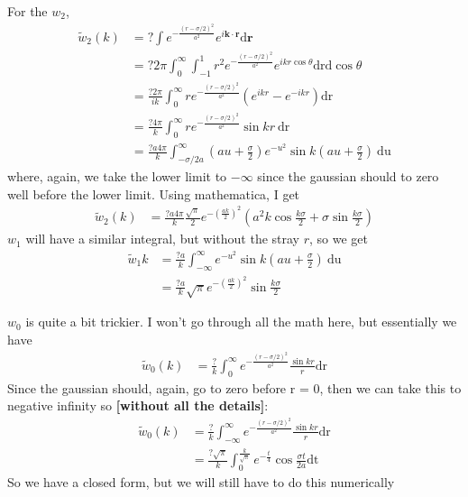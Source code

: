 \documentclass[letterpaper,twocolumn,amsmath,amssymb,prb]{revtex4-1}
\newcommand{\red}[1]{{\bf \color{red} #1}}
\newcommand{\rr}{\textbf{r}}
\newcommand{\fixme}[1]{\red{[#1]}}
\begin{document}
For the $w_2$,
\begin{align}
  \tilde{w}_2(k) &= ?\int e^{-\frac{(r-\sigma/2)^2}{a^2}} e^{i \mathbf{k} \cdot
    \rr} \textrm{d} \rr \\
  &= ? 2\pi \int_0^\infty \int_{-1}^1 r^2 e^{-\frac{(r-\sigma/2)^2}{a^2}}
  e^{ikr\cos{\theta}} \textrm{drd}\cos{\theta} \\
  &= \frac{?2\pi}{ik} \int_0^\infty r e^{-\frac{(r-\sigma/2)^2}{a^2}}
  \left(e^{ikr} - e^{-ikr}\right) \textrm{dr} \\
  &= \frac{?4\pi}{k} \int_0^\infty r e^{-\frac{(r-\sigma/2)^2}{a^2}}
  \sin{kr} ~\textrm{dr} \\
  &= \frac{?a4\pi}{k} \int_{-\sigma/2a}^\infty \left(au +
  \frac{\sigma}{2}\right) e^{-u^2} \sin{k\left(au +
  \frac{\sigma}{2}\right)} ~\textrm{du}
\end{align}
where, again, we take the lower limit to $-\infty$ since the gaussian
should to zero well before the lower limit. Using mathematica, I get
\begin{align}
  \tilde{w}_2(k) &=\frac{?a4\pi}{k}\frac{\sqrt{\pi}}{2}
  e^{-\left(\frac{ak}{2} \right)^2} \left(a^2 k
  \cos{\frac{k\sigma}{2}} +\sigma \sin{\frac{k\sigma}{2}} \right)
\end{align}
$w_1$ will have a similar integral, but without the stray $r$, so we
get
\begin{align}
  \tilde{w}_1{k}&= \frac{?a}{k} \int_{-\infty}^\infty e^{-u^2} \sin{k\left(au +
  \frac{\sigma}{2}\right)} ~\textrm{du} \\
  &= \frac{?a}{k}\sqrt{\pi}e^{-\left(\frac{ak}{2} \right)^2} \sin{\frac{k\sigma}{2}}
\end{align}

$w_0$ is quite a bit trickier.  I won't go through all the math here,
but essentially we have
\begin{align}
  \tilde{w}_0(k) &= \frac{?}{k}\int_0^\infty
  e^{-\frac{(r-\sigma/2)^2}{a^2}} \frac{\sin{kr}}{r}\textrm{dr}
\end{align}
Since the gaussian should, again, go to zero before r = 0, then we can
take this to negative infinity so \fixme{without all the details}:
\begin{align}
  \tilde{w}_0(k) &= \frac{?}{k}\int_{-\infty}^\infty
  e^{-\frac{(r-\sigma/2)^2}{a^2}} \frac{\sin{kr}}{r}\textrm{dr} \\
  &= \frac{?\sqrt{\pi}}{k}\int_0^{\frac{k}{\sqrt{\pi}}}
  e^{-\frac{t}{4}} \cos{\frac{\sigma t}{2a}}\textrm{dt}
\end{align}
So we have a closed form, but we will still have to do this numerically

\end{document}
